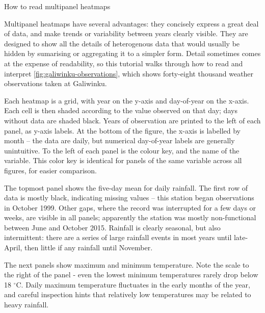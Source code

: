 \begin{framedbox}
\caption[How to read multipanel heatmaps]{How to read multipanel heatmaps}
\label{fig:how-read-multipanel}
    \setlength{\parskip}{4pt}           %
    \setlength{\parindent}{17.62482pt}  %

    Multipanel heatmaps have several advantages: they concisely express a
    great deal of data, and make trends or variability between years clearly
    visible.  They are designed to show all the details of heterogenous data
    that would usually be hidden by sumarising or aggregating it to a simpler
    form.  Detail sometimes comes at the expense of readability, so this tutorial
    walks through how to read and interpret \cref{fig:galiwinku-observations},
    which shows forty-eight thousand weather observations taken at Galiwinku.

    Each heatmap is a grid, with year on the y-axis and day-of-year on the
    x-axis.  Each cell is then shaded according
    to the value observed on that day; days  without data are shaded black.
    Years of observation are printed to the left of each panel, as y-axis labels.
    At the bottom of the figure, the x-axis is labelled by month -- the data
    are daily, but numerical day-of-year labels are generally unintuitive.
    To the left of each panel is the colour key, and the name of the variable.
    This color key is identical for panels of the same variable across all
    figures, for easier comparison.

    The topmost panel shows the five-day mean for daily rainfall.
    The first row of data is mostly black, indicating missing
    values -- this station began observations in October 1999.  Other gaps,
    where the record was interrupted for a few days or weeks, are visible in
    all panels; apparently the station was mostly non-functional between June
    and October 2015.
    Rainfall is clearly seasonal, but also intermittent:  there are a series
    of large rainfall events in most years until late-April, then little if any
    rainfall until November.

    The next panels show maximum and minimum temperature.  Note the scale to
    the right of the panel - even the lowest minimum temperatures rarely drop
    below 18 $^\circ$C.  Daily maximum temperature fluctuates in the
    early months of the year, and careful inspection hints that relatively
    low temperatures may be related to heavy rainfall.


\end{framedbox}

